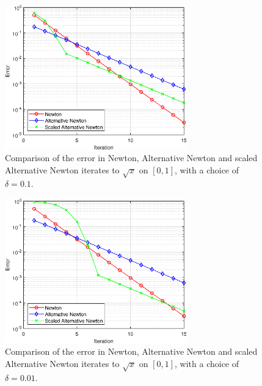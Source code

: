 \begin{figure}[t!]
\centering
   \includegraphics[width=0.7\textwidth,height=0.7\textheight,keepaspectratio]{figures/chapter_4/AN_vs_SAN_0p1.eps}
   \caption{Comparison of the error in Newton, Alternative Newton and scaled Alternative Newton iterates to $\sqrt{x}$ on $[0,1]$, with a choice of $\delta=0.1$.}
   \label{fig:scaled_alt2}
\end{figure}

\begin{figure}[t!]
\centering
   \includegraphics[width=0.7\textwidth,height=0.7\textheight,keepaspectratio]{figures/chapter_4/AN_vs_SAN_0p01.eps}
   \caption{Comparison of the error in Newton, Alternative Newton and scaled Alternative Newton iterates to $\sqrt{x}$ on $[0,1]$, with a choice of $\delta=0.01$.}
   \label{fig:scaled_alt3}
\end{figure}

